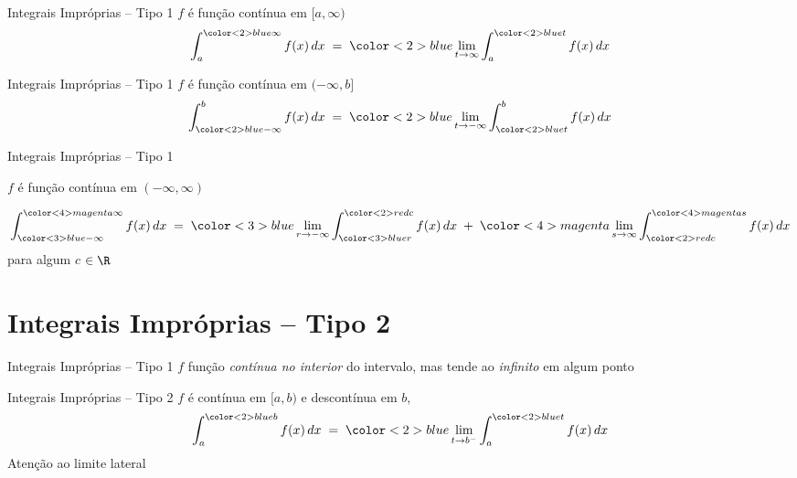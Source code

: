 \begin{frame}{Integrais Impróprias -- Tipo 1}
  $f$ é função contínua em \([a, \infty)\)
  \large
  \[
    \int_a^{{\color<2>{blue} \infty}} f(x) \, dx
    \;=\;  {{\color<2>{blue} \lim_{t\to\infty}}}
    \int_a^{{\color<2>{blue} t}} f(x)  \, dx
  \]
\end{frame}

\begin{frame}{Integrais Impróprias -- Tipo 1}
  $f$ é função contínua em \((-\infty, b]\)
  \large
  \[
    \int_{{\color<2>{blue} -\infty}}^b f(x) \, dx
    \;=\; {\color<2>{blue} \lim_{t\to-\infty}}
    \int_{{\color<2>{blue} t}}^{b} f(x) \,dx
  \]
\end{frame}


\begin{frame}{Integrais Impróprias -- Tipo 1}

  $f$ é função contínua em \((-\infty, \infty)\)

  {\large
  \[
    \int_{{\color<3>{blue}  -\infty}}
        ^{{\color<4>{magenta}\infty}} f(x) \, dx
    \;=\; {\color<3>{blue}   \lim_{r\to-\infty}}
    \int_{{\color<3>{blue}{r}}}
        ^{{\color<2>{red} c}} f(x) \, dx
    \;+\; {\color<4>{magenta}\lim_{s \to \infty}}
    \int_{{\color<2>{red} c}}
        ^{{\color<4>{magenta}s}} f(x) \, dx
  \]}
  para algum { $c$} $\in\R$

\end{frame}

\section{Integrais Impróprias -- Tipo 2}

\begin{frame}{Integrais Impróprias -- Tipo 1}
  $f$ função \emph{contínua no interior} do intervalo,
  mas tende ao \emph{infinito} em algum ponto
\end{frame}

\begin{frame}{Integrais Impróprias -- Tipo 2}
  $f$ é contínua em {\color{blue} $[a, b)$} e descontínua em $b$,
  {
  \large
  \[
    \int_{a}^{{\color<2>{blue} b}} f(x)\,dx
    \;=\;     {\color<2>{blue} \lim_{t\to b^{-}}}
    \int_{a}^{{\color<2>{blue} t}} f(x)\,dx
  \]}
  Atenção ao limite lateral
\end{frame}

